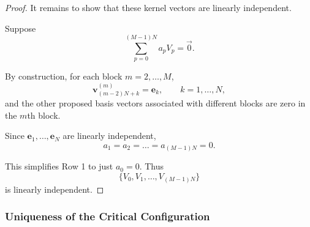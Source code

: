 \documentclass{article}
\begin{document}
\begin{proof}



It remains to show that these kernel vectors are linearly independent.

Suppose
\[
\sum_{p=0}^{(M-1)N} a_pV_p=\vec{0}.
\]

By construction, for each block $m=2,\dots,M$,
\[
\mathbf{v}_{(m-2)N+k}^{(m)}=\mathbf{e}_k,
\qquad k=1,\dots,N,
\]
and the other proposed basis vectors associated with different blocks are zero in the $m$th block.

Since $\mathbf{e}_1,\dots,\mathbf{e}_N$ are linearly independent,
\[
a_1=a_2=\dots=a_{(M-1)N}=0.
\]

This simplifies Row 1 to just $a_{0}=0$.
Thus
\[
\{V_0,V_1,\dots,V_{(M-1)N}\}
\]
is linearly independent.
\end{proof}

\subsubsection{Uniqueness of the Critical Configuration}
\end{document}
